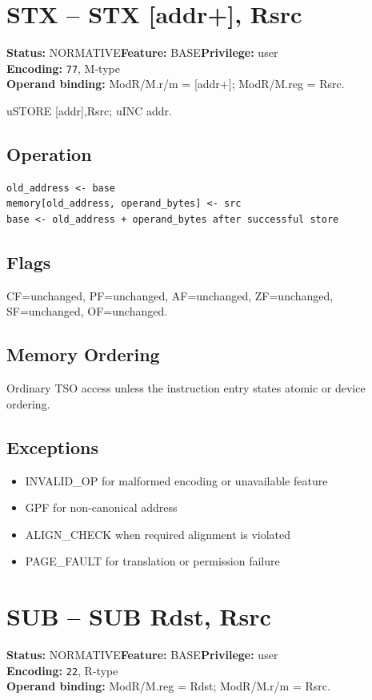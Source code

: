 \documentclass[10pt]{article}
\begin{document}
\section{STX -- STX [addr+], Rsrc}
\textbf{Status:} NORMATIVE\quad \textbf{Feature:} BASE\quad \textbf{Privilege:} user\\
\textbf{Encoding:} \texttt{77}, M-type\\
\textbf{Operand binding:} ModR/M.r/m = [addr+]; ModR/M.reg = Rsrc.

uSTORE [addr],Rsrc; uINC addr.

\subsection*{Operation}
\begin{lstlisting}
old_address <- base
memory[old_address, operand_bytes] <- src
base <- old_address + operand_bytes after successful store
\end{lstlisting}
\subsection*{Flags}
CF=unchanged, PF=unchanged, AF=unchanged, ZF=unchanged, SF=unchanged, OF=unchanged.
\subsection*{Memory Ordering}
Ordinary TSO access unless the instruction entry states atomic or device ordering.
\subsection*{Exceptions}
\begin{itemize}
\item INVALID\_OP for malformed encoding or unavailable feature
\item GPF for non-canonical address
\item ALIGN\_CHECK when required alignment is violated
\item PAGE\_FAULT for translation or permission failure
\end{itemize}
\clearpage

\section{SUB -- SUB Rdst, Rsrc}
\textbf{Status:} NORMATIVE\quad \textbf{Feature:} BASE\quad \textbf{Privilege:} user\\
\textbf{Encoding:} \texttt{22}, R-type\\
\textbf{Operand binding:} ModR/M.reg = Rdst; ModR/M.r/m = Rsrc.
\end{document}
